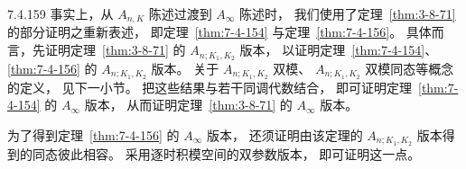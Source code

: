 \begin{remark}{7.4.159}\label{rem:7-4-159}
事实上，从 $A_{n,K}$ 陈述过渡到
$A_\infty$ 陈述时，
我们使用了定理~\ref{thm:3-8-71} 的部分证明之重新表述，
即定理~\ref{thm:7-4-154}
与定理~\ref{thm:7-4-156}。
具体而言，先证明定理~\ref{thm:3-8-71}
的 $A_{n;K_1,K_2}$ 版本，
以证明定理~\ref{thm:7-4-154}、\ref{thm:7-4-156}
的 $A_{n;K_1,K_2}$ 版本。
关于 $A_{n;K_1,K_2}$ 双模、
$A_{n;K_1,K_2}$ 双模同态等概念的定义，
见下一小节。
把这些结果与若干同调代数结合，
即可证明定理~\ref{thm:7-4-154} 的
$A_\infty$ 版本，
从而证明定理~\ref{thm:3-8-71} 的
$A_\infty$ 版本。

为了得到定理~\ref{thm:7-4-156} 的
$A_\infty$ 版本，
还须证明由该定理的
$A_{n;K_1,K_2}$ 版本得到的同态彼此相容。
采用逐时积模空间的双参数版本，
即可证明这一点。
\end{remark}
